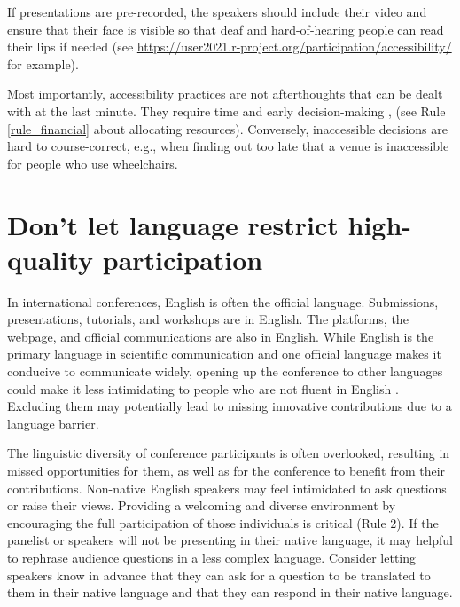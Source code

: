 \documentclass[10pt,letterpaper]{article}
\begin{document}
 If presentations are pre-recorded, the speakers should include their video and ensure that their face is visible so that deaf and hard-of-hearing people can read their lips if needed (see \url{https://user2021.r-project.org/participation/accessibility/} for example). 
 
Most importantly, accessibility practices are not afterthoughts that can be dealt with at the last minute. 
They require time and early decision-making \cite{irishIncreasingParticipationUsing2020}, (see Rule \ref{rule_financial} about allocating resources). Conversely, inaccessible decisions are hard to course-correct, e.g., when finding out too late that a venue is inaccessible for people who use wheelchairs. 



\section{Don't let language restrict high-quality participation}
\label{rule_language}

In international conferences, English is often the official language. Submissions, presentations, tutorials, and workshops are in English. The platforms, the webpage, and official communications are also in English. While English is the primary language in scientific communication and one official language makes it conducive to communicate widely, opening up the conference to other languages could make it less intimidating to people who are not fluent in English \cite{ninerBetterWhomLeveling2021}. Excluding them may potentially lead to missing innovative contributions due to a language barrier. 


The linguistic diversity of conference participants is often overlooked, resulting in missed opportunities for them, as well as for the conference to benefit from their contributions. Non-native English speakers may feel intimidated to ask questions or raise their views. Providing a welcoming and diverse environment by encouraging the full participation of those individuals is critical (Rule 2). If the panelist or speakers will not be presenting in their native language, it may helpful to rephrase audience questions in a less complex language. Consider letting speakers know in advance that they can ask for a question to be translated to them in their native language and that they can respond in their native language.
\end{document}
